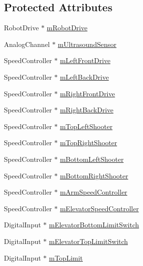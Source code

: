 \subsection*{\-Protected \-Attributes}
\begin{DoxyCompactItemize}
\item 
\-Robot\-Drive $\ast$ \hyperlink{class_main_robot_af30bcbfefdc86125ee358df0070ffc6c}{m\-Robot\-Drive}
\item 
\-Analog\-Channel $\ast$ \hyperlink{class_main_robot_abf7ba8751a75e0b3d7157ac359ee45c0}{m\-Ultrasound\-Sensor}
\item 
\-Speed\-Controller $\ast$ \hyperlink{class_main_robot_aa4ebe10faab3310b89beab973c71495f}{m\-Left\-Front\-Drive}
\item 
\-Speed\-Controller $\ast$ \hyperlink{class_main_robot_aed74497f38a5fa85edbcbdbc62c7aa5d}{m\-Left\-Back\-Drive}
\item 
\-Speed\-Controller $\ast$ \hyperlink{class_main_robot_a1bfc90c1733f991a56a311b1d76aa5c5}{m\-Right\-Front\-Drive}
\item 
\-Speed\-Controller $\ast$ \hyperlink{class_main_robot_a1dbda505a92e08b53818aea4c1c14ff4}{m\-Right\-Back\-Drive}
\item 
\-Speed\-Controller $\ast$ \hyperlink{class_main_robot_afcd7a094aaf209800538edc2877e3da2}{m\-Top\-Left\-Shooter}
\item 
\-Speed\-Controller $\ast$ \hyperlink{class_main_robot_a809d62629624a0df2727b264b05f296c}{m\-Top\-Right\-Shooter}
\item 
\-Speed\-Controller $\ast$ \hyperlink{class_main_robot_a69e7d492c28398a78c60f2e81c83c988}{m\-Bottom\-Left\-Shooter}
\item 
\-Speed\-Controller $\ast$ \hyperlink{class_main_robot_a3656f8030169345c6ba13814265fc37f}{m\-Bottom\-Right\-Shooter}
\item 
\-Speed\-Controller $\ast$ \hyperlink{class_main_robot_ae7b1431cf829a6e482e88cc96eb212fc}{m\-Arm\-Speed\-Controller}
\item 
\-Speed\-Controller $\ast$ \hyperlink{class_main_robot_a4eed75b4a0820bc454befbf958974732}{m\-Elevator\-Speed\-Controller}
\item 
\-Digital\-Input $\ast$ \hyperlink{class_main_robot_a1e38fd4d2d15887d10bf651eccb543f5}{m\-Elevator\-Bottom\-Limit\-Switch}
\item 
\-Digital\-Input $\ast$ \hyperlink{class_main_robot_ae6176b12fcb13c89aa3693b073897b1a}{m\-Elevator\-Top\-Limit\-Switch}
\item 
\-Digital\-Input $\ast$ \hyperlink{class_main_robot_add74215b836445c14c44d346eaab5fb8}{m\-Top\-Limit}

\end{DoxyCompactItemize}
